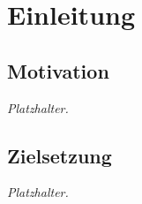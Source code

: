 \section{Einleitung}
\label{sec:einleitung}


\subsection{Motivation}
\label{sec:motivation}

\textit{Platzhalter.}

\subsection{Zielsetzung}
\label{sec:zielsetzung}

\textit{Platzhalter.}

